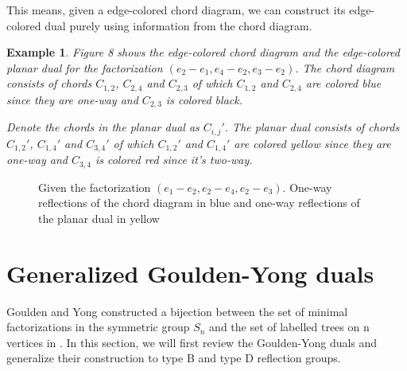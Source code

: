 \documentclass[11pt]{amsart}
\newtheorem{exa}[thm]{Example}%
\begin{document}
This means, given a edge-colored chord diagram, we can construct its edge-colored dual purely using information from the chord diagram.

\begin{exa}
    Figure 8 shows the edge-colored chord diagram and the edge-colored planar dual for the factorization $(e_2-e_1,e_4-e_2,e_3-e_2)$. The chord diagram consists of chords $C_{1,2}$, $C_{2,4}$ and $C_{2,3}$ of which $C_{1,2}$ and $C_{2,4}$ are colored blue since they are one-way and $C_{2,3}$ is colored black.

    Denote the chords in the planar dual as $C_{i,j}'$. The planar dual consists of chords $C_{1,2}'$, $C_{1,4}'$ and $C_{3,4}'$ of which $C_{1,2}'$ and $C_{1,4}'$ are colored yellow since they are one-way and $C_{3,4}$ is colored red since it's two-way.
\end{exa}

\begin{figure}
    \centering
    \caption{Given the factorization $(e_1-e_2,e_2-e_4,e_2-e_3)$. One-way reflections of the chord diagram in blue and one-way reflections of the planar dual in yellow}
\end{figure}

\section{Generalized Goulden-Yong duals}

Goulden and Yong constructed a bijection between the set of minimal factorizations in the symmetric group $S_n$ and the set of labelled trees on n vertices in \cite{MR1897927}. In this section, we will first review the Goulden-Yong duals and generalize their construction to type B and type D reflection groups.
\end{document}
